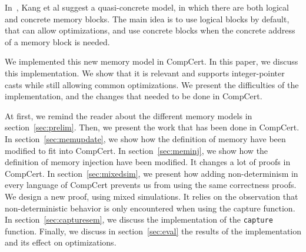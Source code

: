 In~\cite{DBLP:conf/pldi/KangHMGZV15}, Kang et al suggest a quasi-concrete model, in which there are both logical and concrete memory blocks. The main idea is to use logical blocks by default, that can allow optimizations, and use concrete blocks when the concrete address of a memory block is needed.

We implemented this new memory model in CompCert.
In this paper, we discuss this implementation.
We show that it is relevant and supports integer-pointer casts while still allowing common optimizations.
We present the difficulties of the implementation, and the changes that needed to be done in CompCert.

At first, we remind the reader about the different memory models in section~\ref{sec:prelim}.
Then, we present the work that has been done in CompCert.
In section~\ref{sec:memupdate}, we show how the definition of memory have been modified to fit into CompCert.
In section~\ref{sec:meminj}, we show how the definition of memory injection have been modified. It changes a lot of proofs in CompCert.
In section~\ref{sec:mixedsim}, we present how adding non-determinism in every language of CompCert prevents us from using the same correctness proofs. We design a new proof, using mixed simulations. It relies on the observation that non-deterministic behavior is only encountered when using the capture function.
In section~\ref{sec:capturesem}, we discuss the implementation of the \texttt{capture} function.
Finally, we discuss in section~\ref{sec:eval} the results of the implementation and its effect on optimizations. 
